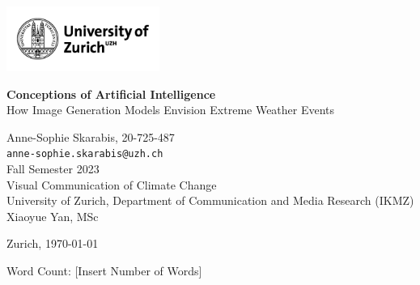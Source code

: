 \begin{titlepage}
\selectfont %

\noindent
\includegraphics[width=5cm]{resources/uzh_logo_e_pos_standard.jpg} %

\vspace*{2cm} %

\begin{center}

\vspace*{2.5cm}

\Huge
\textbf{Conceptions of Artificial Intelligence} \\ %
\Large
How Image Generation Models Envision Extreme Weather Events %

\vspace{1.5cm}

\Large
Anne-Sophie Skarabis, 20-725-487 \\
\normalsize
\texttt{anne-sophie.skarabis@uzh.ch} \\
\vspace{0.5cm}
\small
Fall Semester 2023 \\
Visual Communication of Climate Change \\
University of Zurich, Department of Communication and Media Research (IKMZ) \\
Xiaoyue Yan, MSc

\vspace{1cm}
\small
Zurich, \today %

\vfill

\small
Word Count: [Insert Number of Words]


\end{center}
\end{titlepage}